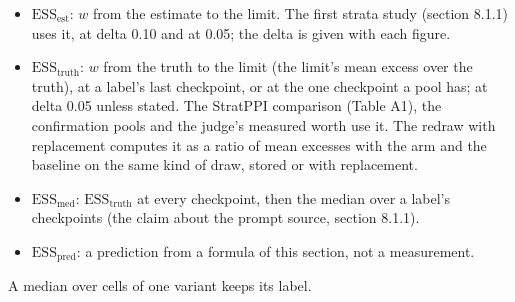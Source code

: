 \documentclass[11pt]{article}
\begin{document}
\begin{itemize}
\item $\mathrm{ESS}_{\mathrm{est}}$: $w$ from the estimate to the limit. The first strata study (section 8.1.1) uses it, at delta 0.10 and at 0.05; the delta is given with each figure.
\item $\mathrm{ESS}_{\mathrm{truth}}$: $w$ from the truth to the limit (the limit's mean excess over the truth), at a label's last checkpoint, or at the one checkpoint a pool has; at delta 0.05 unless stated. The StratPPI comparison (Table A1), the confirmation pools and the judge's measured worth use it. The redraw with replacement computes it as a ratio of mean excesses with the arm and the baseline on the same kind of draw, stored or with replacement.
\item $\mathrm{ESS}_{\mathrm{med}}$: $\mathrm{ESS}_{\mathrm{truth}}$ at every checkpoint, then the median over a label's checkpoints (the claim about the prompt source, section 8.1.1).
\item $\mathrm{ESS}_{\mathrm{pred}}$: a prediction from a formula of this section, not a measurement.
\end{itemize}

A median over cells of one variant keeps its label.
\end{document}
